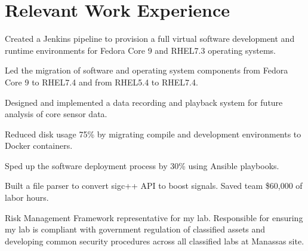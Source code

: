 \documentclass[letterpaper]{deedy-resume} %
\begin{document}
\begin{minipage}[t]{0.71\textwidth} %


\section{Relevant Work Experience}


\vspace{\topsep} %

\begin{tightitemize}
\item Created a Jenkins pipeline to provision a full virtual software development and runtime environments for Fedora Core 9 and RHEL7.3 operating systems.
\item Led the migration of software and operating system components from Fedora Core 9 to RHEL7.4 and from RHEL5.4 to RHEL7.4.
\item Designed and implemented a data recording and playback system for future analysis of core sensor data.
\item Reduced disk usage 75\% by migrating compile and development environments to Docker containers.
\item Sped up the software deployment process by 30\% using Ansible playbooks.
\item Built a file parser to convert sigc++ API to boost signals. Saved team \$60,000 of labor hours.
\item Risk Management Framework representative for my lab. Responsible for ensuring my lab is compliant with government regulation of classified assets and developing common security procedures across all classified labs at Manassas site.
\end{tightitemize}

\sectionspace %





\end{minipage}
\end{document}
